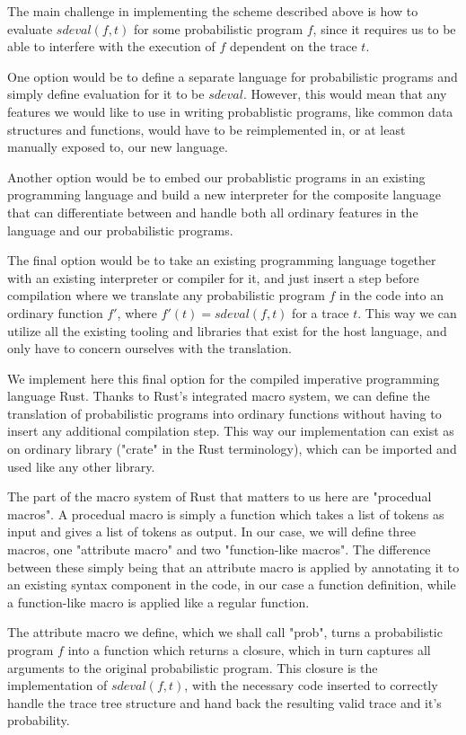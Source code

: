 The main challenge in implementing the scheme described above is how to evaluate $sdeval(f, t)$ for some probabilistic program $f$, since it requires us to be able to interfere with the execution of $f$ dependent on the trace $t$.

One option would be to define a separate language for probabilistic programs and simply define evaluation for it to be $sdeval$. However, this would mean that any features we would like to use in writing probablistic programs, like common data structures and functions, would have to be reimplemented in, or at least manually exposed to, our new language.

Another option would be to embed our probablistic programs in an existing programming language and build a new interpreter for the composite language that can differentiate between and handle both all ordinary features in the language and our probabilistic programs.

The final option would be to take an existing programming language together with an existing interpreter or compiler for it, and just insert a step before compilation where we translate any probabilistic program $f$ in the code into an ordinary function $f'$, where $f'(t) = sdeval(f,t)$ for a trace $t$. This way we can utilize all the existing tooling and libraries that exist for the host language, and only have to concern ourselves with the translation.

We implement here this final option for the compiled imperative programming language Rust. Thanks to Rust's integrated macro system, we can define the translation of probabilistic programs into ordinary functions without having to insert any additional compilation step. This way our implementation can exist as on ordinary library ("crate" in the Rust terminology), which can be imported and used like any other library.

The part of the macro system of Rust that matters to us here are "procedual macros". A procedual macro is simply a function which takes a list of tokens as input and gives a list of tokens as output. In our case, we will define three macros, one "attribute macro" and two "function-like macros". The difference between these simply being that an attribute macro is applied by annotating it to an existing syntax component in the code, in our case a function definition, while a function-like macro is applied like a regular function.

The attribute macro we define, which we shall call "prob", turns a probabilistic program $f$ into a function which returns a closure, which in turn captures all arguments to the original probabilistic program. This closure is the implementation of $sdeval(f,t)$, with the necessary code inserted to correctly handle the trace tree structure and hand back the resulting valid trace and it's probability.

